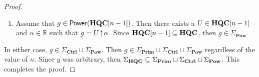 \begin{proof}
\begin{enumerate}
\begin{equation*}
              \subseteq
              \CatHQC[n]
              \subseteq
              \CatHQC
          \end{equation*}
          Moreover, $g = g_1 \odot V$.
          In conclusion, $g \in \Sigma_{\mathbf{Ctrl}}$.
    \item Assume that $g \in \mathsf{Power}( \mathbf{HQC}[n-1] )$.
          Then there exists a $U \in \mathbf{HQC}[n-1]$ and $\alpha \in \mathbb{R}$ such that $g = U \!\uparrow\! \alpha$.
          Since $\mathbf{HQC}[n-1] \subseteq \mathbf{HQC}$, then $g \in \Sigma_{\mathbf{Pow}}$.
    \end{enumerate}
    In either case, $g \in \Sigma_{\textbf{Ctrl}} \sqcup \Sigma_{\textbf{Pow}}$.
    Then $g \in \Sigma_{\textbf{Prim}} \sqcup \Sigma_{\textbf{Ctrl}} \sqcup \Sigma_{\textbf{Pow}}$ regardless of the value of $n$.
    Since $g$ was arbitrary, then $\Sigma_{\mathbf{HQC}} \subseteq \Sigma_{\textbf{Prim}} \sqcup \Sigma_{\textbf{Ctrl}} \sqcup \Sigma_{\textbf{Pow}}$.
    This completes the proof.
\end{proof}